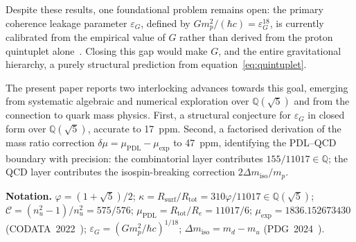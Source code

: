 \documentclass[11pt,a4paper]{article}
\theoremstyle{definition}
\newcommand{\Rsurf}{R_{\mathrm{surf}}}
\newcommand{\Rtot}{R_{\mathrm{tot}}}
\newcommand{\epsg}{\varepsilon_G}
\newcommand{\calC}{\mathcal{C}}
\newcommand{\vp}{\varphi}
\newcommand{\kap}{\kappa}
\newcommand{\muPDL}{\mu_{\mathrm{PDL}}}
\newcommand{\muexp}{\mu_{\mathrm{exp}}}
\newcommand{\dmu}{\delta\mu}
\newcommand{\dmiso}{\Delta m_{\mathrm{iso}}}
\begin{document}
Despite these results, one foundational problem remains open: the primary coherence leakage parameter $\epsg$, defined by $Gm_p^2/(\hbar c) = \epsg^{18}$, is currently calibrated from the empirical value of $G$ rather than derived from the proton quintuplet alone~\cite{Bridge_PDL_2026}. Closing this gap would make $G$, and the entire gravitational hierarchy, a purely structural prediction from equation~\eqref{eq:quintuplet}.

The present paper reports two interlocking advances towards this goal, emerging from systematic algebraic and numerical exploration over $\mathbb{Q}(\sqrt{5})$ and from the connection to quark mass physics. First, a structural conjecture for $\epsg$ in closed form over $\mathbb{Q}(\sqrt{5})$, accurate to 17~ppm. Second, a factorised derivation of the mass ratio correction $\dmu = \muPDL - \muexp$ to 47~ppm, identifying the PDL--QCD boundary with precision: the combinatorial layer contributes $155/11017 \in \mathbb{Q}$; the QCD layer contributes the isospin-breaking correction $2\dmiso/m_p$.

\medskip\noindent\textbf{Notation.} $\vp = (1+\sqrt{5})/2$; $\kap = \Rsurf/\Rtot = 310\vp/11017 \in \mathbb{Q}(\sqrt{5})$; $\calC = (n_u^2-1)/n_u^2 = 575/576$; $\muPDL = \Rtot/R_e = 11017/6$; $\muexp = 1836.152673430$ (CODATA~2022~\cite{CODATA_2022}); $\epsg = (Gm_p^2/\hbar c)^{1/18}$; $\dmiso = m_d - m_u$ (PDG~2024~\cite{PDG_2024}).
\end{document}
